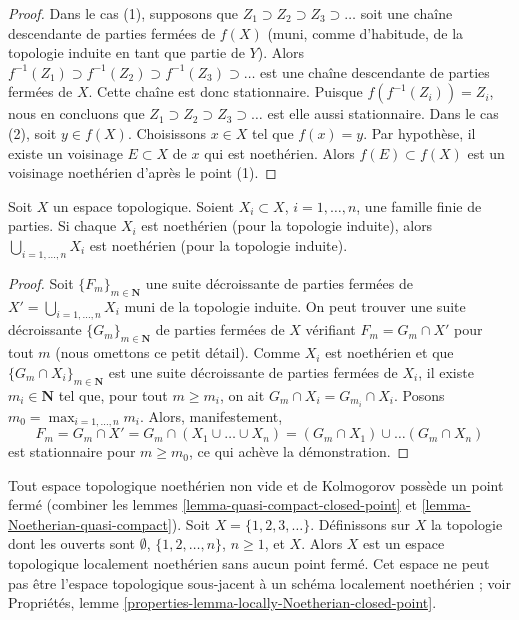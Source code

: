 \begin{proof}
Dans le cas (1), supposons que
$Z_1 \supset Z_2 \supset Z_3 \supset \ldots$ soit une chaîne descendante de
parties fermées de $f(X)$ (muni, comme d'habitude, de la topologie induite en
tant que partie de $Y$). Alors
$f^{-1}(Z_1) \supset f^{-1}(Z_2) \supset f^{-1}(Z_3) \supset \ldots$ est une
chaîne descendante de parties fermées de $X$. Cette chaîne est donc
stationnaire. Puisque $f(f^{-1}(Z_i)) = Z_i$, nous en concluons que
$Z_1 \supset Z_2 \supset Z_3 \supset \ldots$ est elle aussi stationnaire.
Dans le cas (2), soit $y \in f(X)$. Choisissons $x \in X$ tel que
$f(x) = y$. Par hypothèse, il existe un voisinage $E \subset X$ de $x$ qui est
noethérien. Alors $f(E) \subset f(X)$ est un voisinage noethérien d'après le
point (1).
\end{proof}

\begin{lemma}
\label{lemma-finite-union-Noetherian}
Soit $X$ un espace topologique.
Soient $X_i \subset X$, $i = 1, \ldots, n$, une famille finie de parties.
Si chaque $X_i$ est noethérien (pour la topologie induite), alors
$\bigcup_{i = 1, \ldots, n}  X_i$ est noethérien (pour la topologie induite).
\end{lemma}

\begin{proof}
Soit $\{F_m\}_{m \in \mathbf{N}}$ une suite décroissante de parties fermées de
$X' = \bigcup_{i = 1, \ldots, n}  X_i$ muni de la topologie induite.
On peut trouver une suite décroissante $\{G_m\}_{m \in \mathbf{N}}$ de parties
fermées de $X$ vérifiant $F_m = G_m \cap X'$ pour tout $m$ (nous omettons ce
petit détail). Comme $X_i$ est noethérien et que
$\{G_m \cap X_i\}_{m \in \mathbf{N}}$ est une suite décroissante de parties
fermées de $X_i$, il existe $m_i \in \mathbf{N}$ tel que, pour tout
$m \geq m_i$, on ait $G_m \cap X_i = G_{m_i} \cap X_i$.
Posons $m_0 = \max_{i = 1, \ldots, n} m_i$. Alors, manifestement,
$$
F_m = G_m \cap X' = G_m \cap (X_1 \cup \ldots \cup X_n) =
(G_m \cap X_1) \cup \ldots (G_m \cap X_n)
$$
est stationnaire pour $m \geq m_0$, ce qui achève la démonstration.
\end{proof}

\begin{example}
\label{example-locally-Noetherian-no-closed-point}
Tout espace topologique noethérien non vide et de Kolmogorov possède un point
fermé (combiner les lemmes \ref{lemma-quasi-compact-closed-point} et
\ref{lemma-Noetherian-quasi-compact}).
Soit $X = \{1, 2, 3, \ldots \}$. Définissons sur $X$ la topologie dont les
ouverts sont $\emptyset$, $\{1, 2, \ldots, n\}$, $n \geq 1$, et $X$.
Alors $X$ est un espace topologique localement noethérien sans aucun point
fermé. Cet espace ne peut pas être l'espace topologique sous-jacent à un schéma
localement noethérien ; voir Propriétés, lemme
\ref{properties-lemma-locally-Noetherian-closed-point}.
\end{example}

